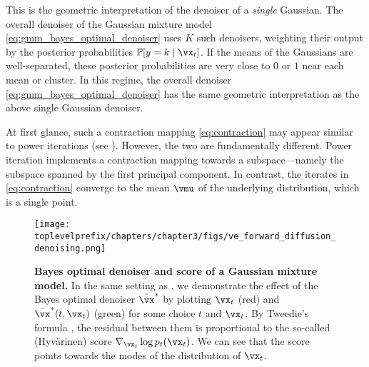 \documentclass[../../book-main.tex]{subfiles}
\begin{document}
\begin{example}
	This is the geometric interpretation of the denoiser of a \textit{single} Gaussian. The overall denoiser of the Gaussian mixture model \eqref{eq:gmm_bayes_optimal_denoiser} uses \(K\) such denoisers, weighting their output by the posterior probabilities \(\Pr[y = k \mid \vx_{t}]\). If the means of the Gaussians are well-separated, these posterior probabilities are very close to \(0\) or \(1\) near each mean or cluster. In this regime, the overall denoiser \eqref{eq:gmm_bayes_optimal_denoiser} has the same geometric interpretation as the above single Gaussian denoiser.

    At first glance, such a contraction mapping \eqref{eq:contraction} may appear similar to power iterations (see ).  However, the two are fundamentally different. Power iteration implements a contraction mapping towards a subspace---namely the subspace spanned by the first principal component. In contrast, the iterates in \eqref{eq:contraction} converge to the mean \(\vmu\) of the underlying distribution, which is a single point.  
\end{example}

\begin{figure}
	\centering 
	\texttt{[image: \\toplevelprefix/chapters/chapter3/figs/ve\_forward\_diffusion\_denoising.png]}\vspace{-0.15in}
	\caption{\small \textbf{Bayes optimal denoiser and score of a Gaussian mixture model.} In the same setting as , we demonstrate the effect of the Bayes optimal denoiser \(\bar{\vx}^{\ast}\) by plotting \(\vx_{t}\) (red) and \(\bar{\vx}^{\ast}(t, \vx_{t})\) (green) for some choice \(t\) and \(\vx_{t}\). By Tweedie's formula , the residual between them is proportional to the so-called (Hyv\"arinen) score \(\nabla_{\vx_{t}}\log p_{t}(\vx_{t})\). We can see that the score points towards the modes of the distribution of \(\vx_{t}\).}
	\label{fig:ve_forward_denoising}
\end{figure}
\end{document}
